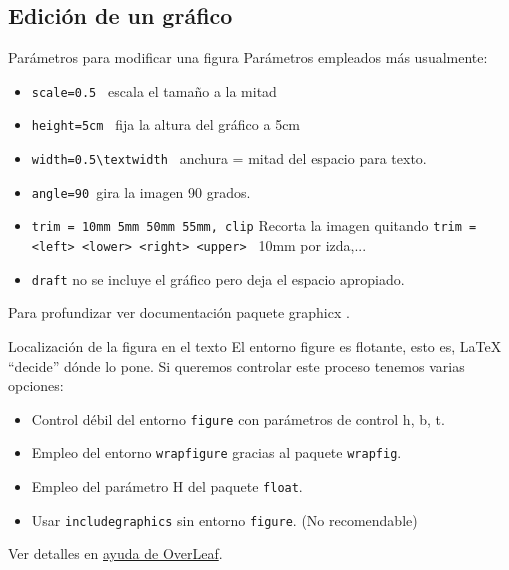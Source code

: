 \documentclass[10pt]{beamer}
\begin{document}
\subsection{Edici\'on de un gr\'afico}
\begin{frame}[fragile]{Parámetros para modificar una figura}
Parámetros empleados más usualmente:
\begin{itemize}
    \item \verb|scale=0.5 | \hfill escala el tamaño a la mitad
    \item \verb|height=5cm | \hfill fija la altura del gráfico a 5cm
    \item \verb|width=0.5\textwidth | \hfill anchura = mitad del espacio para texto.
    \item \verb|angle=90 |\hfill  gira la imagen 90 grados.
    \item \verb|trim = 10mm 5mm 50mm 55mm, clip| \hfill Recorta la imagen quitando
\verb|trim = <left> <lower> <right> <upper> | \hfill 10mm por izda,...
    \item \verb|draft| \hfill no se incluye el gráfico pero deja el espacio apropiado.
\end{itemize}
\vspace{1cm}
Para profundizar ver documentaci\'on paquete graphicx \cite{DocGraphicx} .
\end{frame}
\begin{frame}[fragile]{Localización de la figura en el texto}
El entorno figure es flotante, esto es, \LaTeX{} ``decide''
dónde lo pone. Si queremos controlar este proceso tenemos varias 
opciones:
\begin{itemize}
    \item Control débil del entorno \verb|figure| con parámetros 
    de control h, b, t. 
    \item Empleo del entorno \verb|wrapfigure| \cite{wrapfigure} gracias al paquete \verb|wrapfig|.
    \item Empleo del parámetro H del paquete \verb|float|.
    \item Usar \verb|includegraphics| sin entorno \verb|figure|. \hfill (No recomendable)
\end{itemize}
\vspace{1cm}
Ver detalles en \href{https://www.overleaf.com/learn/latex/Positioning_images_and_tables}{\color{blue}ayuda de OverLeaf}.
\end{frame}
\end{document}
